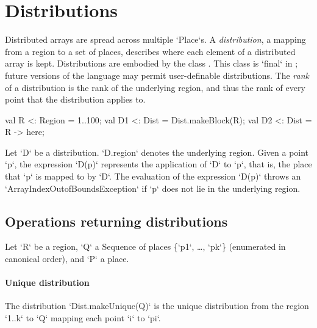 \section{Distributions}\label{XtenDistributions}

Distributed arrays are spread across multiple \xcd`Place`s.  
A {\em distribution}, a mapping from a region to a set of places, 
describes where each element of a distributed array is kept.
Distributions are embodied by the class .
This class is \xcd`final` in
{}\XtenCurrVer; future versions of the language may permit
user-definable distributions. 
The {\em rank} of a distribution is the rank of the underlying region, and
thus the rank of every point that the distribution applies to.



\begin{xten}
val R  <: Region = 1..100;
val D1 <: Dist = Dist.makeBlock(R);
val D2 <: Dist = R -> here;
\end{xten}

Let \xcd`D` be a distribution. 
\xcd`D.region` 
denotes the underlying
region. 
Given a point \xcd`p`, the expression
\xcd`D(p)` represents the application of \xcd`D` to \xcd`p`, that is,
the place that \xcd`p` is mapped to by \xcd`D`. The evaluation of the
expression \xcd`D(p)` throws an \xcd`ArrayIndexOutofBoundsException`
if \xcd`p` does not lie in the underlying region.


\subsection{Operations returning distributions}

Let \xcd`R` be a region, \xcd`Q` a Sequence of places \{\xcd`p1`, \dots,
\xcd`pk`\} (enumerated in canonical order), and \xcd`P` a place.

\paragraph{Unique distribution} 
The distribution \xcd`Dist.makeUnique(Q)` is the unique distribution from the
region \xcd`1..k` to \xcd`Q` mapping each point \xcd`i` to \xcd`pi`.

